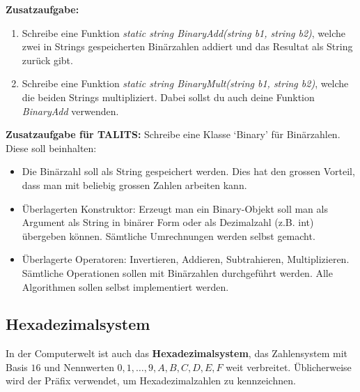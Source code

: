 \newpage


\begin{question}
	\textbf{Zusatzaufgabe:}
	\begin{enumerate}
		\item Schreibe eine Funktion \textit{static string BinaryAdd(string b1, string b2)}, welche zwei in Strings gespeicherten Binärzahlen addiert und das Resultat als String zurück gibt.
		\item Schreibe eine Funktion \textit{static string BinaryMult(string b1, string b2)}, welche die beiden Strings multipliziert. Dabei sollst du auch deine Funktion \textit{BinaryAdd} verwenden.
	\end{enumerate}
\end{question}
\begin{solution}
\end{solution}


\begin{question}
	\textbf{Zusatzaufgabe für TALITS:} Schreibe eine Klasse `Binary' für Binärzahlen. Diese soll beinhalten:
	\begin{itemize}
		\item Die Binärzahl soll als String gespeichert werden. Dies hat den grossen Vorteil, dass man mit beliebig grossen Zahlen arbeiten kann.
		\item Überlagerten Konstruktor: Erzeugt man ein Binary-Objekt soll man als Argument als String in binärer Form oder als Dezimalzahl (z.B. int) übergeben können. Sämtliche Umrechnungen werden selbst gemacht.
		\item Überlagerte Operatoren: Invertieren, Addieren, Subtrahieren, Multiplizieren. Sämtliche Operationen sollen mit Binärzahlen durchgeführt werden. Alle Algorithmen sollen selbst implementiert werden.
	\end{itemize}
\end{question}
\begin{solution}
	
\end{solution}

\newpage

\subsection{Hexadezimalsystem}

In der Computerwelt ist auch das \textbf{Hexadezimalsystem}, das Zahlensystem mit Basis $16$ und Nennwerten $0,1,\ldots,9,A,B,C,D,E,F$ weit verbreitet. Üblicherweise wird der Präfix  verwendet, um Hexadezimalzahlen zu kennzeichnen.

